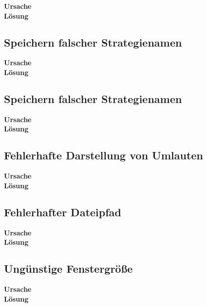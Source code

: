 \textbf{Ursache}\\
\textbf{Lösung}

\subsection{Speichern falscher Strategienamen}

\textbf{Ursache}\\
\textbf{Lösung}

\subsection{Speichern falscher Strategienamen}

\textbf{Ursache}\\
\textbf{Lösung}

\subsection{Fehlerhafte Darstellung von Umlauten}

\textbf{Ursache}\\
\textbf{Lösung}

\subsection{Fehlerhafter Dateipfad}

\textbf{Ursache}\\
\textbf{Lösung}

\subsection{Ungünstige Fenstergröße}

\textbf{Ursache}\\
\textbf{Lösung}

